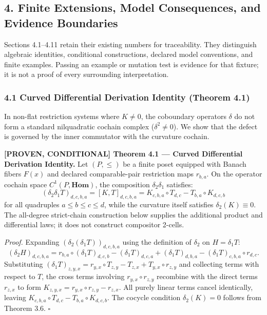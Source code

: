 \documentclass[
  english,
  10pt,
  a4paper,
]{article}
\renewenvironment{quote}
  {\begin{leftbar}\small}
  {\end{leftbar}}
\begin{document}
\subsection{4. Finite Extensions, Model Consequences, and Evidence
Boundaries}\label{finite-extensions-model-consequences-and-evidence-boundaries}

Sections 4.1--4.11 retain their existing numbers for traceability. They
distinguish algebraic identities, conditional constructions, declared
model conventions, and finite examples. Passing an example or mutation
test is evidence for that fixture; it is not a proof of every
surrounding interpretation.

\subsubsection{4.1 Curved Differential Derivation Identity (Theorem
4.1)}\label{curved-differential-derivation-identity-theorem-4.1}

In non-flat restriction systems where \(K \ne 0\), the coboundary
operators \(\delta\) do not form a standard nilquadratic cochain complex
(\(\delta^2 \ne 0\)). We show that the defect is governed by the inner
commutator with the curvature cochain.

\begin{quote}
\textbf{{[}PROVEN, CONDITIONAL{]} Theorem 4.1 --- Curved Differential
Derivation Identity.} Let \((P, \le)\) be a finite poset equipped with
Banach fibers \(F(x)\) and declared comparable-pair restriction maps
\(r_{b,a}\). On the operator cochain space \(C^1(P, \mathbf{Hom})\), the
composition \(\delta_2 \delta_1\) satisfies: \[
(\delta_2 \delta_1 T)_{d,c,b,a} = [K, T]_{d,c,b,a} = K_{c,b,a} \circ T_{d,c} - T_{b,a} \circ K_{d,c,b}
\] for all quadruples \(a \le b \le c \le d\), while the curvature
itself satisfies \(\delta_2(K) \equiv 0\). The all-degree strict-chain
construction below supplies the additional product and differential
laws; it does not construct compositor 2-cells.

\emph{Proof.} Expanding \((\delta_2(\delta_1 T))_{d,c,b,a}\) using the
definition of \(\delta_2\) on \(H = \delta_1 T\): \[
(\delta_2 H)_{d,c,b,a} = r_{b,a} \circ (\delta_1 T)_{d,c,b} - (\delta_1 T)_{d,c,a} + (\delta_1 T)_{d,b,a} - (\delta_1 T)_{c,b,a} \circ r_{d,c}.
\] Substituting
\((\delta_1 T)_{z,y,x} = r_{y,x} \circ T_{z,y} - T_{z,x} + T_{y,x} \circ r_{z,y}\)
and collecting terms with respect to \(T\), the cross terms involving
\(r_{y,x} \circ r_{z,y}\) recombine with the direct terms \(r_{z,x}\) to
form \(K_{z,y,x} = r_{y,x} \circ r_{z,y} - r_{z,x}\). All purely linear
terms cancel identically, leaving
\(K_{c,b,a} \circ T_{d,c} - T_{b,a} \circ K_{d,c,b}\). The cocycle
condition \(\delta_2(K) = 0\) follows from Theorem 3.6. \(\square\)
\end{quote}
\end{document}
